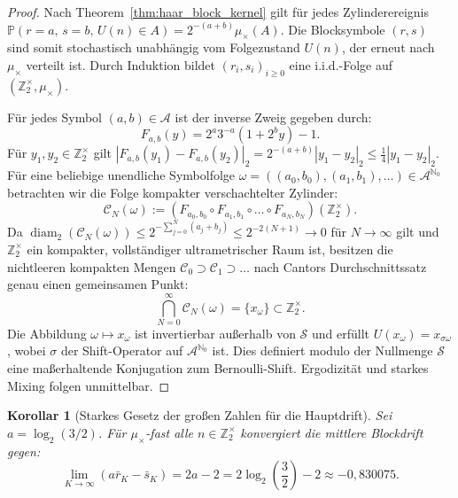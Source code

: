 \documentclass[11pt,reqno]{amsart}
\newtheorem{corollary}[theorem]{Korollar}
\theoremstyle{definition}
\theoremstyle{remark}
\numberwithin{equation}{section}
\begin{document}
\begin{proof}
Nach Theorem~\ref{thm:haar_block_kernel} gilt f\"ur jedes Zylinderereignis $\mathbb{P}(r = a, \, s = b, \, U(n) \in A) = 2^{-(a+b)} \mu_\times(A)$. Die Blocksymbole $(r, s)$ sind somit stochastisch unabh\"angig vom Folgezustand $U(n)$, der erneut nach $\mu_\times$ verteilt ist. Durch Induktion bildet $(r_i, s_i)_{i \ge 0}$ eine i.i.d.-Folge auf $(\mathbb{Z}_2^\times, \mu_\times)$.

F\"ur jedes Symbol $(a, b) \in \mathcal{A}$ ist der inverse Zweig gegeben durch:
\begin{equation}
F_{a,b}(y) = 2^a 3^{-a}(1 + 2^b y) - 1.
\end{equation}
F\"ur $y_1, y_2 \in \mathbb{Z}_2^\times$ gilt $|F_{a,b}(y_1) - F_{a,b}(y_2)|_2 = 2^{-(a+b)} |y_1 - y_2|_2 \le \frac{1}{4} |y_1 - y_2|_2$. 
F\"ur eine beliebige unendliche Symbolfolge $\omega = ((a_0, b_0), (a_1, b_1), \dots) \in \mathcal{A}^{\mathbb{N}_0}$ betrachten wir die Folge kompakter verschachtelter Zylinder:
\begin{equation}
\mathcal{C}_N(\omega) := \left( F_{a_0, b_0} \circ F_{a_1, b_1} \circ \dots \circ F_{a_N, b_N} \right)(\mathbb{Z}_2^\times).
\end{equation}
Da $\operatorname{diam}_2(\mathcal{C}_N(\omega)) \le 2^{-\sum_{j=0}^N (a_j + b_j)} \le 2^{-2(N+1)} \to 0$ f\"ur $N \to \infty$ gilt und $\mathbb{Z}_2^\times$ ein kompakter, vollst\"andiger ultrametrischer Raum ist, besitzen die nichtleeren kompakten Mengen $\mathcal{C}_0 \supset \mathcal{C}_1 \supset \dots$ nach Cantors Durchschnittssatz genau einen gemeinsamen Punkt:
\begin{equation}
\bigcap_{N=0}^\infty \mathcal{C}_N(\omega) = \{ x_\omega \} \subset \mathbb{Z}_2^\times.
\end{equation}
Die Abbildung $\omega \mapsto x_\omega$ ist invertierbar au\ss{}erhalb von $\mathcal{S}$ und erf\"ullt $U(x_\omega) = x_{\sigma\omega}$, wobei $\sigma$ der Shift-Operator auf $\mathcal{A}^{\mathbb{N}_0}$ ist. Dies definiert modulo der Nullmenge $\mathcal{S}$ eine ma\ss{}erhaltende Konjugation zum Bernoulli-Shift. Ergodizit\"at und starkes Mixing folgen unmittelbar.
\end{proof}

\begin{corollary}[Starkes Gesetz der gro\ss{}en Zahlen f\"ur die Hauptdrift]
\label{cor:slln_drift}
Sei $a = \log_2(3/2)$. F\"ur $\mu_\times$-fast alle $n \in \mathbb{Z}_2^\times$ konvergiert die mittlere Blockdrift gegen:
\begin{equation}
\lim_{K \to \infty} \left( a \bar{r}_K - \bar{s}_K \right) = 2 a - 2 = 2 \log_2\left(\frac{3}{2}\right) - 2 \approx -0{,}830075.
\end{equation}
\end{corollary}
\end{document}
